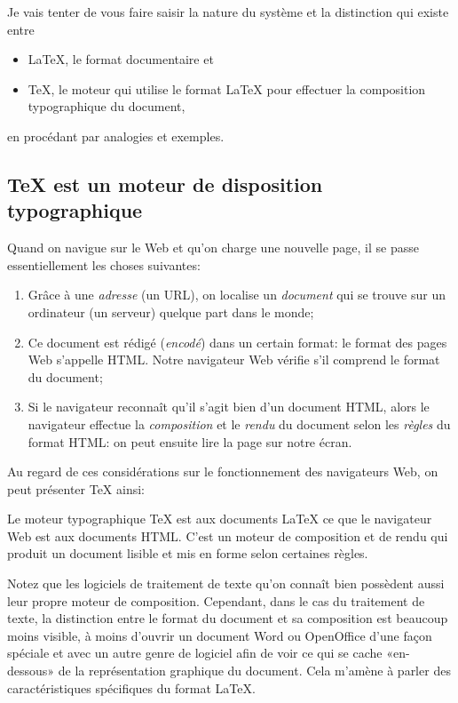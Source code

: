 \documentclass{article}
\newenvironment{defex}
{\begin{tcolorbox}[
    colback=yellow!5!white,
    colframe=red!25!black,
    coltext=red!25!black,
    arc=0mm,
    outer arc=0mm,
    toprule=0mm,
    bottomrule=0mm,
]}
{\end{tcolorbox}}
\begin{document}
Je vais tenter de vous faire saisir la nature du système et la distinction qui existe entre

\begin{itemize}
\item \LaTeX{}, le format documentaire et
\item \TeX{}, le moteur qui utilise le format \LaTeX{} pour effectuer la composition typographique du document,
\end{itemize}

en procédant par analogies et exemples.

\subsection{\TeX{} est un moteur de disposition typographique}

Quand on navigue sur le Web et qu’on charge une nouvelle page, il se passe essentiellement les choses suivantes:

\begin{enumerate}
\item Grâce à une \emph{adresse} (un URL), on localise un \emph{document} qui se trouve sur un ordinateur (un serveur) quelque part dans le monde;
\item Ce document est rédigé (\emph{encodé}) dans un certain format: le format des pages Web s’appelle HTML. Notre navigateur Web vérifie s’il comprend le format du document;
\item Si le navigateur reconnaît qu’il s’agit bien d’un document HTML, alors le navigateur effectue la \emph{composition} et le \emph{rendu} du document selon les \emph{règles} du format HTML: on peut ensuite lire la page sur notre écran.
\end{enumerate}

Au regard de ces considérations sur le fonctionnement des navigateurs Web, on peut présenter \TeX{} ainsi:

\begin{defex}
Le moteur typographique \TeX{} est aux documents \LaTeX{} ce que le navigateur Web est aux documents HTML. C’est un moteur de composition et de rendu qui produit un document lisible et mis en forme selon certaines règles.
\end{defex}

Notez que les logiciels de traitement de texte qu’on connaît bien possèdent aussi leur propre moteur de composition. Cependant, dans le cas du traitement de texte, la distinction entre le format du document et sa composition est beaucoup moins visible, à moins d’ouvrir un document Word ou OpenOffice d’une façon spéciale et avec un autre genre de logiciel afin de voir ce qui se cache «en-dessous» de la représentation graphique du document. Cela m’amène à parler des caractéristiques spécifiques du format \LaTeX{}.
\end{document}
